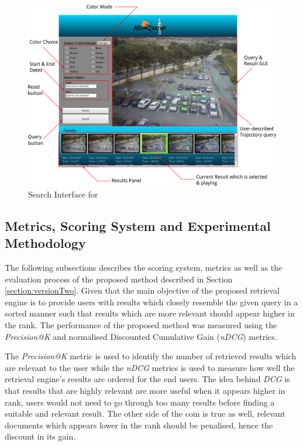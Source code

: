 \begin{figure}[!hbt]\centering
\includegraphics[width=.9\textwidth]{image/retrievalTwo/VISERinterface2.png}
\caption{Search Interface for \versionTwoRet}
\label{fig:versionTwoInterface}
\end{figure}

\subsection{Metrics, Scoring System and Experimental Methodology}

The following subsections describes the scoring system, metrics as well as the evaluation process of the proposed method described in Section \ref{section:versionTwo}. Given that the main objective of the proposed retrieval engine is to provide users with results which closely resemble the given query in a sorted manner such that results which are more relevant should appear higher in the rank. The performance of the proposed method was measured using the \textit{Precision@K} and normalised Discounted Cumulative Gain (\textit{nDCG}) metrics.

The \textit{Precision@K} metric is used to identify the number of retrieved results which are relevant to the user while the \textit{nDCG} metrics is used to measure how well the retrieval engine's results are ordered for the end users. The idea behind \textit{DCG} is that results that are highly relevant are more useful when it appears higher in rank, users would not need to go through too many results before finding a suitable and relevant result. The other side of the coin is true as well, relevant documents which appears lower in the rank should be penalised, hence the discount in its gain.

